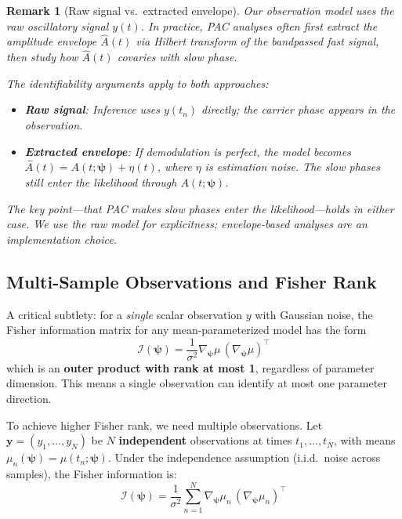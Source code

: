 \documentclass[12pt]{article}
\newtheorem{remark}[theorem]{Remark}
\newcommand{\FIM}{\mathcal{I}}
\begin{document}
\begin{remark}[Raw signal vs.\ extracted envelope]
\label{rem:observation_type}
Our observation model uses the \emph{raw} oscillatory signal $y(t)$. In practice, PAC analyses often first extract the amplitude envelope $\hat{A}(t)$ via Hilbert transform of the bandpassed fast signal, then study how $\hat{A}(t)$ covaries with slow phase.

The identifiability arguments apply to both approaches:
\begin{itemize}
    \item \textbf{Raw signal}: Inference uses $y(t_n)$ directly; the carrier phase appears in the observation.
    \item \textbf{Extracted envelope}: If demodulation is perfect, the model becomes $\hat{A}(t) = A(t;\bm{\psi}) + \eta(t)$, where $\eta$ is estimation noise. The slow phases still enter the likelihood through $A(t;\bm{\psi})$.
\end{itemize}
The key point---that PAC makes slow phases enter the likelihood---holds in either case. We use the raw model for explicitness; envelope-based analyses are an implementation choice.
\end{remark}

\subsection{Multi-Sample Observations and Fisher Rank}

A critical subtlety: for a \emph{single} scalar observation $y$ with Gaussian noise, the Fisher information matrix for any mean-parameterized model has the form
\begin{equation}
\FIM(\bm{\psi}) = \frac{1}{\sigma^2} \nabla_{\bm{\psi}} \mu \, (\nabla_{\bm{\psi}} \mu)^\top
\label{eq:outer_product}
\end{equation}
which is an \textbf{outer product with rank at most 1}, regardless of parameter dimension. This means a single observation can identify at most one parameter direction.

To achieve higher Fisher rank, we need multiple observations. Let $\bm{y} = (y_1, \ldots, y_N)$ be $N$ \textbf{independent} observations at times $t_1, \ldots, t_N$, with means $\mu_n(\bm{\psi}) = \mu(t_n; \bm{\psi})$. Under the independence assumption (i.i.d.\ noise across samples), the Fisher information is:
\begin{equation}
\FIM(\bm{\psi}) = \frac{1}{\sigma^2} \sum_{n=1}^{N} \nabla_{\bm{\psi}} \mu_n \, (\nabla_{\bm{\psi}} \mu_n)^\top
\label{eq:fisher_sum}
\end{equation}
\end{document}
